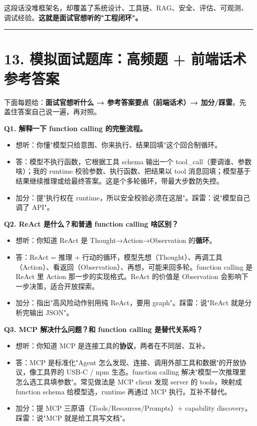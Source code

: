 这段话没堆框架名，却覆盖了系统设计、工具链、RAG、安全、评估、可观测、调试经验。\textbf{这就是面试官想听的"工程闭环"。}

\bigskip\hrule\bigskip

\section{13. 模拟面试题库：高频题 + 前端话术参考答案}

下面每题给：\textbf{面试官想听什么 → 参考答案要点（前端话术）→ 加分/踩雷}。先盖住答案自己说一遍，再对照。

\textbf{Q1. 解释一下 function calling 的完整流程。}
\begin{itemize}[leftmargin=2em]
\item 想听：你懂"模型只给意图、你来执行、结果回填"这个回合制循环。
\item 答：模型不执行函数，它根据工具 schema 输出一个 tool\_call（要调谁、参数啥）；我的 runtime 校验参数、执行函数、把结果以 tool 消息回填；模型基于结果继续推理或给最终答案。这是个多轮循环，带最大步数防失控。
\item 加分：提"执行权在 runtime，所以安全校验必须在这层"。踩雷：说"模型自己调了 API"。
\end{itemize}

\textbf{Q2. ReAct 是什么？和普通 function calling 啥区别？}
\begin{itemize}[leftmargin=2em]
\item 想听：你知道 ReAct 是 Thought→Action→Observation 的\textbf{循环}。
\item 答：ReAct = 推理 + 行动的循环，模型先想（Thought）、再调工具（Action）、看返回（Observation）、再想，可能来回多轮。function calling 是 ReAct 里 Action 那一步的实现格式。ReAct 的价值是 Observation 会影响下一步决策，适合开放探索。
\item 加分：指出"高风险动作别用纯 ReAct，要用 graph"。踩雷：说"ReAct 就是分析完输出 JSON"。
\end{itemize}

\textbf{Q3. MCP 解决什么问题？和 function calling 是替代关系吗？}
\begin{itemize}[leftmargin=2em]
\item 想听：你知道 MCP 是连接工具的\textbf{协议}，两者在不同层、互补。
\item 答：MCP 是标准化"Agent 怎么发现、连接、调用外部工具和数据"的开放协议，像工具界的 USB-C / npm 生态。function calling 解决"模型一次推理里怎么选工具填参数"。常见做法是 MCP client 发现 server 的 tools，映射成 function schema 给模型选，runtime 再通过 MCP 执行。互补不替代。
\item 加分：提 MCP 三原语（Tools/Resources/Prompts）+ capability discovery。踩雷：说"MCP 就是给工具写文档"。
\end{itemize}

